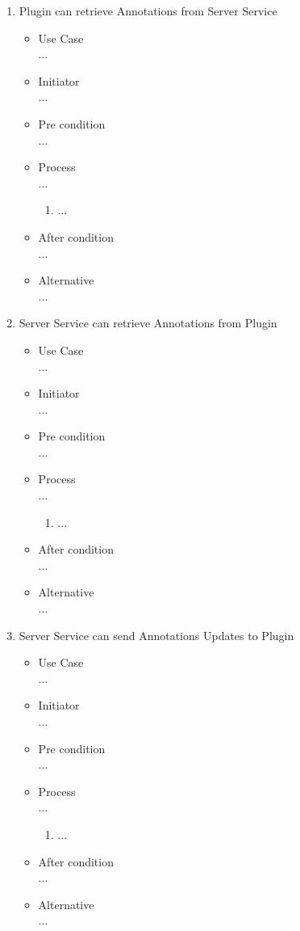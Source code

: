 \begin{enumerate}[UseC. A.]
\item {Plugin can retrieve Annotations from Server Service}
\begin{itemize}
	\item Use Case \\
...
	\item Initiator \\
...
	\item Pre condition \\ 
...
	\item Process \\
...
	\begin{enumerate}
		\item ...
	\end{enumerate}
	
	\item After condition \\ 
...
	\item Alternative \\ 
...	
\end{itemize}


\item {Server Service can retrieve Annotations from Plugin}
\begin{itemize}
	\item Use Case \\
...
	\item Initiator \\
...
	\item Pre condition \\ 
...
	\item Process \\
...
	\begin{enumerate}
		\item ...
	\end{enumerate}
	
	\item After condition \\ 
...
	\item Alternative \\ 
...	
\end{itemize}

\item {Server Service can send  Annotations Updates to Plugin}
\begin{itemize}
	\item Use Case \\
...
	\item Initiator \\
...
	\item Pre condition \\ 
...
	\item Process \\
...
	\begin{enumerate}
		\item ...
	\end{enumerate}
	
	\item After condition \\ 
...
	\item Alternative \\ 
...	
\end{itemize}
\end{enumerate}
